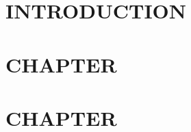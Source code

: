 
\chapter{INTRODUCTION} \label{ch:introduction} 


\chapter{CHAPTER} \label{ch:chapter2} 


\chapter{CHAPTER} \label{ch:chapter3}

